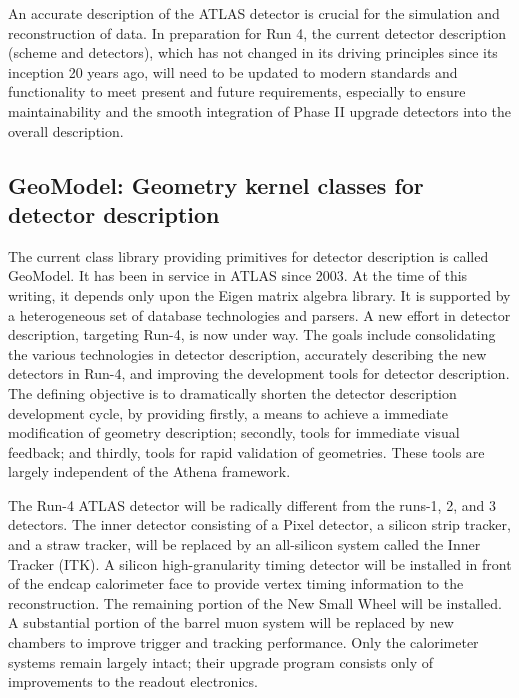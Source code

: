  
\label{sec:detdescr}

An accurate description of the ATLAS detector is crucial for the simulation and reconstruction of data. In preparation for Run 4, the current detector description (scheme and detectors), which has not changed in its driving principles since its inception 20 years ago, will need to be updated to modern standards and functionality to meet present and future requirements, especially to ensure maintainability and the smooth integration of Phase II upgrade detectors into the overall description. 



\subsection{GeoModel: Geometry kernel classes for detector description}

The current class library providing primitives for detector description is called GeoModel. It has been in service in ATLAS since 2003.  At the time of this writing, it depends only upon the Eigen matrix algebra library. It is supported by a heterogeneous set of database technologies and parsers. A new  effort in detector description, targeting Run-4, is now under  way. The goals include consolidating the various technologies in detector description, accurately describing the new  detectors in Run-4, and improving the development tools for detector  description. The defining objective is to dramatically shorten the detector description development cycle, by providing firstly, a means to achieve a immediate modification of geometry description; secondly, tools for immediate visual feedback; and thirdly, tools for rapid validation of geometries. These tools are largely independent of the Athena framework. 

The Run-4 ATLAS detector will be radically different from the runs-1, 2, and 3 detectors. The inner detector consisting of a Pixel detector, a silicon strip tracker, and a straw tracker, will be replaced by an all-silicon system called the Inner Tracker (ITK)\cite{Collaboration:2285585,Collaboration:2257755}. A silicon high-granularity timing detector\cite{Collaboration:2623663} will be installed in front of the endcap calorimeter face to provide vertex timing information to the reconstruction.  The remaining portion of the New Small Wheel\cite{Kawamoto:1552862} will be installed. A substantial portion of the barrel muon system will be replaced by new chambers to improve trigger and tracking performance.  Only the calorimeter systems remain largely intact; their upgrade program consists only of improvements to the readout electronics. 



